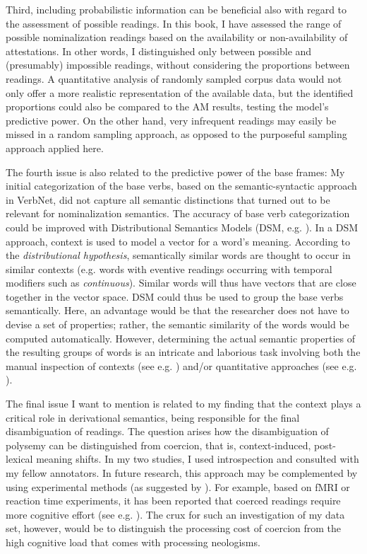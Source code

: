 Third, including probabilistic information can be beneficial also with regard to the assessment of possible readings.
In this book, I have assessed the range of possible nominalization readings based on the availability or non-availability of attestations. In other words, I distinguished only between possible and (presumably) impossible readings, without considering the proportions between readings. A quantitative analysis of randomly sampled corpus data would not only offer a more realistic representation of the available data, but the identified proportions could also be compared to the AM results, testing the model's predictive power. On the other hand, very infrequent readings may easily be missed in a random sampling approach, as opposed to the purposeful sampling approach applied here.   

The fourth issue is also related to the predictive power of the base frames: My initial categorization of the base verbs, based on the semantic-syntactic approach in VerbNet, did not capture all semantic distinctions that turned out to be relevant for nominalization semantics. 
The accuracy of base verb categorization could be improved with Distributional Semantics Models (DSM, e.g. \citealt{Boleda.2019,Marelli.2015}).
In a DSM approach, context is used to model a vector for a word's meaning. According to the \textit{distributional hypothesis}, semantically similar words are thought to occur in similar contexts (e.g. words with eventive readings occurring with temporal modifiers such as \textit{continuous}). Similar words will thus have vectors that are close together in the vector space. DSM could thus be used to group the base verbs semantically.
Here, an advantage would be that the researcher does not have to devise a set of properties; rather, the semantic similarity of the words would be computed automatically. However, determining the actual semantic properties of the resulting groups of words is an intricate and laborious task involving both the manual inspection of contexts (see e.g. \citealt{Lapesa.2018}) and/or quantitative approaches (see e.g. \citealt{Wauquier.2020}).

The final issue I want to mention is related to my finding that the context plays a critical role in derivational semantics, being responsible for the final disambiguation of readings. The question arises how the disambiguation of polysemy can be distinguished from coercion, that is, context-induced,  post-lexical meaning shifts. 
In my two studies, I used introspection and consulted with my fellow annotators. In future research, this approach may be complemented by using experimental methods (as suggested by \citealt[195--196]{Loebner.2008}). For example, based on fMRI or reaction time experiments, it has been reported that coerced readings require more cognitive effort (see e.g. \citealt{Lai.2017}). The crux for such an investigation of my data set, however, would be to distinguish the processing cost of coercion from the high cognitive load that comes with processing neologisms. 

